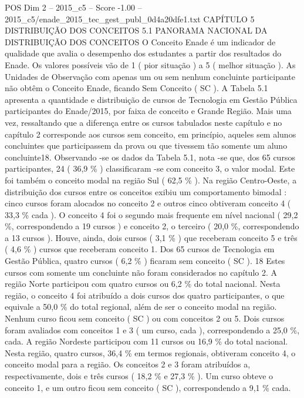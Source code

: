 \begin{textsample}{POS Dim 2 – 2015\_c5 – Score -1.00 – 2015\_c5/enade\_2015\_tec\_gest\_publ\_0d4a20dfe1.txt}  \label{ex:f2_pos_278}
CAPÍTULO 5 DISTRIBUIÇÃO DOS CONCEITOS 5.1 PANORAMA NACIONAL DA DISTRIBUIÇÃO DOS CONCEITOS O Conceito Enade é um indicador de qualidade que avalia o desempenho dos estudantes a partir dos resultados do Enade.
Os valores possíveis vão de 1 ( pior situação ) a 5 ( melhor situação ).
As Unidades de Observação com apenas um ou sem nenhum concluinte participante não obtêm o Conceito Enade, ficando Sem Conceito ( SC ).
A Tabela 5.1 apresenta a quantidade e distribuição de cursos de Tecnologia em Gestão Pública participantes do Enade/2015, por faixa de conceito e Grande Região.
Mais uma vez, ressaltando que a diferença entre os cursos tabulados neste capítulo e no capítulo 2 corresponde aos cursos sem conceito, em princípio, aqueles sem alunos concluintes que participassem da prova ou que tivessem tão somente um aluno concluinte18.
Observando -se os dados da Tabela 5.1, nota -se que, dos 65 cursos participantes, 24 ( 36,9 \% ) classificaram -se com conceito 3, o valor modal.
Este foi também o conceito modal na região Sul ( 62,5 \% ).
Na região Centro-Oeste, a distribuição dos cursos entre os conceitos exibiu um comportamento bimodal : cinco cursos foram alocados no conceito 2 e outros cinco obtiveram conceito 4 ( 33,3 \% cada ).
O conceito 4 foi o segundo mais frequente em nível nacional ( 29,2 \%, correspondendo a 19 cursos ) e conceito 2, o terceiro ( 20,0 \%, correspondendo a 13 cursos ).
Houve, ainda, dois cursos ( 3,1 \% ) que receberam conceito 5 e três ( 4,6 \% ) cursos que receberam conceito 1.
Dos 65 cursos de Tecnologia em Gestão Pública, quatro cursos ( 6,2 \% ) ficaram sem conceito ( SC ). 18 Estes cursos com somente um concluinte não foram considerados no capítulo 2.
A região Norte participou com quatro cursos ou 6,2 \% do total nacional.
Nesta região, o conceito 4 foi atribuído a dois cursos dos quatro participantes, o que equivale a 50,0 \% do total regional, além de ser o conceito modal na região.
Nenhum curso ficou sem conceito ( SC ) ou com conceitos 2 ou 5.
Dois cursos foram avaliados com conceitos 1 e 3 ( um curso, cada ), correspondendo a 25,0 \%, cada.
A região Nordeste participou com 11 cursos ou 16,9 \% do total nacional.
Nesta região, quatro cursos, 36,4 \% em termos regionais, obtiveram conceito 4, o conceito modal para a região.
Os conceitos 2 e 3 foram atribuídos a, respectivamente, dois e três cursos ( 18,2 \% e 27,3 \% ).
Um curso obteve o conceito 1, e um outro ficou sem conceito ( SC ), correspondendo a 9,1 \% cada.

\end{textsample}
